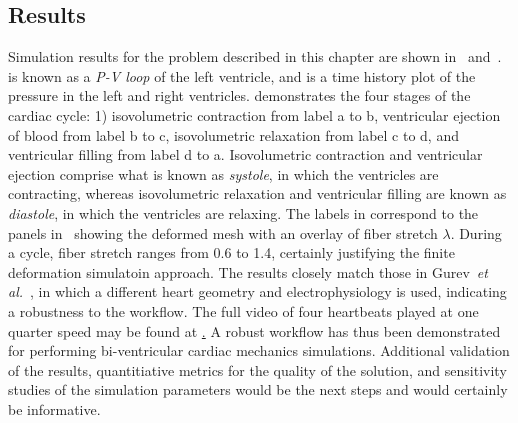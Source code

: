 \subsection{Results}
\label{Results}

Simulation results for the problem described in this chapter are shown in~ and~.  is known as a \textit{P-V loop} of the left ventricle, and  is a time history plot of the pressure in the left and right ventricles.  demonstrates the four stages of the cardiac cycle: 1) isovolumetric contraction from label a to b, ventricular ejection of blood from label b to c, isovolumetric relaxation from label c to d, and ventricular filling from label d to a. Isovolumetric contraction and ventricular ejection comprise what is known as \textit{systole}, in which the ventricles are contracting, whereas isovolumetric relaxation and ventricular filling are known as \textit{diastole}, in which the ventricles are relaxing. The labels in  correspond to the panels in~ showing the deformed mesh with an overlay of fiber stretch $\lambda$. During a cycle, fiber stretch ranges from 0.6 to 1.4, certainly justifying the finite deformation simulatoin approach. The results closely match those in Gurev~\textit{et al.}~\cite{gurev_2015}, in which a different heart geometry and electrophysiology is used, indicating a robustness to the workflow. The full video of four heartbeats played at one quarter speed may be found at \href{youtu.be/RtQKEjdR4MU}. A robust workflow has thus been demonstrated for performing bi-ventricular cardiac mechanics simulations. Additional validation of the results, quantitiative metrics for the quality of the solution, and sensitivity studies of the simulation parameters would be the next steps and would certainly be informative.

